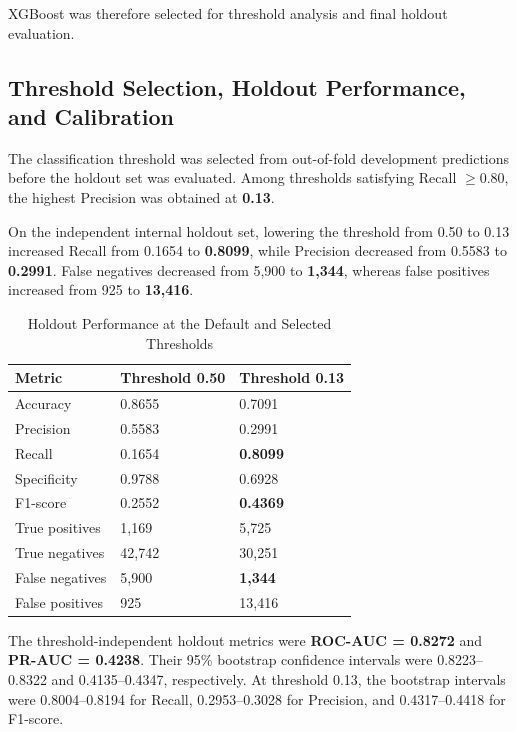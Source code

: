 \documentclass[pdflatex,sn-basic,Numbered]{sn-jnl}
\begin{document}
XGBoost was therefore selected for threshold analysis and final holdout
evaluation.


\subsection{Threshold Selection, Holdout Performance, and Calibration}
\label{subsec:holdout_results}

The classification threshold was selected from out-of-fold development
predictions before the holdout set was evaluated.
Among thresholds satisfying Recall $\geq 0.80$, the highest Precision was
obtained at \textbf{0.13}.

On the independent internal holdout set, lowering the threshold from 0.50
to 0.13 increased Recall from 0.1654 to
\textbf{0.8099}, while Precision decreased from 0.5583 to
\textbf{0.2991}.
False negatives decreased from 5,900 to
\textbf{1,344}, whereas false positives increased from 925 to
\textbf{13,416}.

\begin{table}[htbp]
\centering
\caption{Holdout Performance at the Default and Selected Thresholds}
\label{tab:threshold_comparison}
\footnotesize
\renewcommand{\arraystretch}{1.4}
\setlength{\tabcolsep}{8pt}

\begin{tabularx}{\linewidth}{lYY}
\toprule
Metric & Threshold 0.50 & \textbf{Threshold 0.13} \\
\midrule

Accuracy      & 0.8655 & 0.7091 \\
Precision     & 0.5583 & 0.2991 \\
Recall        & 0.1654 & \textbf{0.8099} \\
Specificity   & 0.9788 & 0.6928 \\
F1-score      & 0.2552 & \textbf{0.4369} \\
True positives & 1,169 & 5,725 \\
True negatives & 42,742 & 30,251 \\
False negatives & 5,900 & \textbf{1,344} \\
False positives & 925 & 13,416 \\

\bottomrule
\end{tabularx}
\end{table}

The threshold-independent holdout metrics were
\textbf{ROC-AUC = 0.8272} and
\textbf{PR-AUC = 0.4238}.
Their 95\% bootstrap confidence intervals were
0.8223--0.8322 and 0.4135--0.4347, respectively.
At threshold 0.13, the bootstrap intervals were
0.8004--0.8194 for Recall,
0.2953--0.3028 for Precision, and
0.4317--0.4418 for F1-score.
\end{document}
